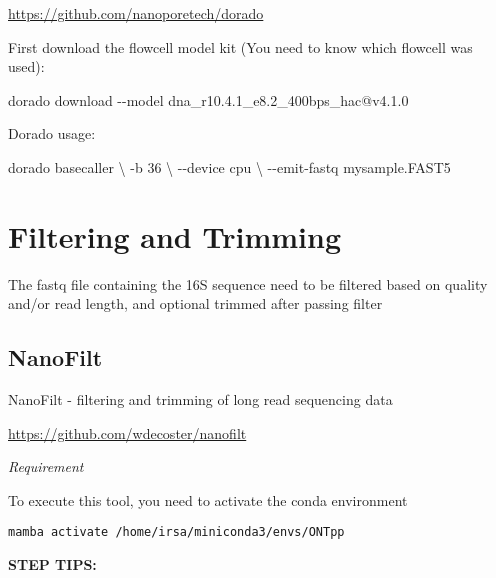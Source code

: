 \documentclass[
]{book}
\newenvironment{Shaded}{\begin{snugshade}}{\end{snugshade}}
\newcommand{\AttributeTok}[1]{\textcolor[rgb]{0.13,0.29,0.53}{#1}}
\newcommand{\DataTypeTok}[1]{\textcolor[rgb]{0.13,0.29,0.53}{#1}}
\newcommand{\ExtensionTok}[1]{#1}
\newcommand{\NormalTok}[1]{#1}
\begin{document}
\url{https://github.com/nanoporetech/dorado}

First download the flowcell model kit (You need to know which flowcell was used):

\begin{Shaded}
\begin{Highlighting}[]
\ExtensionTok{dorado}\NormalTok{ download }\AttributeTok{{-}{-}model}\NormalTok{ dna\_r10.4.1\_e8.2\_400bps\_hac@v4.1.0}
\end{Highlighting}
\end{Shaded}

Dorado usage:

\begin{Shaded}
\begin{Highlighting}[]
\ExtensionTok{dorado}\NormalTok{ basecaller }\DataTypeTok{\textbackslash{}}
  \AttributeTok{{-}b}\NormalTok{ 36 }\DataTypeTok{\textbackslash{}}
  \AttributeTok{{-}{-}device}\NormalTok{ cpu }\DataTypeTok{\textbackslash{}}
  \AttributeTok{{-}{-}emit{-}fastq}
  \ExtensionTok{mysample.FAST5}
\end{Highlighting}
\end{Shaded}

\section{Filtering and Trimming}\label{filtering-and-trimming}

The fastq file containing the 16S sequence need to be filtered based on quality and/or read length, and optional trimmed after passing filter

\subsection{NanoFilt}\label{nanofilt}

NanoFilt - filtering and trimming of long read sequencing data

\url{https://github.com/wdecoster/nanofilt}

\emph{Requirement}

To execute this tool, you need to activate the conda environment

\texttt{mamba\ activate\ /home/irsa/miniconda3/envs/ONTpp}

\textbf{STEP TIPS:}
\end{document}
